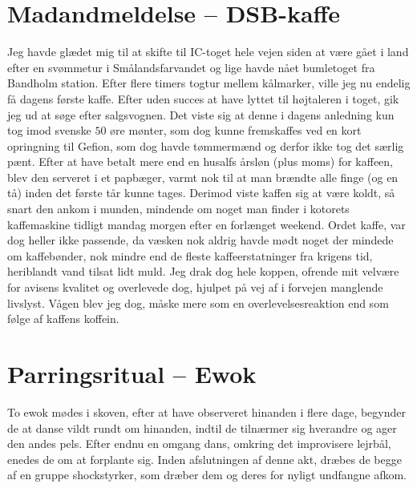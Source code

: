 \begin{minipage}[t]{100mm}
\vspace{3mm}
\section*{Madandmeldelse -- DSB-kaffe}
\vspace{2mm}

Jeg havde glædet mig til at skifte til IC-toget hele vejen siden at være gået i land efter en svømmetur i Smålandsfarvandet og lige havde nået bumletoget fra Bandholm station. Efter flere timers togtur mellem kålmarker, ville jeg nu endelig få dagens første kaffe. Efter uden succes at have lyttet til højtaleren i toget, gik jeg ud at søge efter salgsvognen. Det viste sig at denne i dagens anledning kun tog imod svenske $50$ øre mønter, som dog kunne fremskaffes ved en kort opringning til Gefion, som dog havde tømmermænd og derfor ikke tog det særlig pænt. Efter at have betalt mere end en husalfs årsløn (plus moms) for kaffeen, blev den serveret i et papbæger, varmt nok til at man brændte alle finge (og en tå) inden det første tår kunne tages. Derimod viste kaffen sig at være koldt, så snart den ankom i munden, mindende om noget man finder i kotorets kaffemaskine tidligt mandag morgen efter en forlænget weekend. Ordet kaffe, var dog heller ikke passende, da væsken nok aldrig havde mødt noget der mindede om kaffebønder, nok mindre end de fleste kaffeerstatninger fra krigens tid, heriblandt vand tilsat lidt muld. Jeg drak dog hele koppen, ofrende mit velvære for avisens kvalitet og overlevede dog, hjulpet på vej af i forvejen manglende livslyst. Vågen blev jeg dog, måske mere som en overlevelsesreaktion end som følge af kaffens koffein.

\section*{Parringsritual -- Ewok}
To ewok mødes i skoven, efter at have observeret hinanden i flere dage, begynder de at danse vildt rundt om hinanden, indtil de tilnærmer sig hverandre og ager den andes pels. Efter endnu en omgang dans, omkring det improvisere lejrbål, enedes de om at forplante sig. Inden afslutningen af denne akt, dræbes de begge af en gruppe shockstyrker, som dræber dem og deres for nyligt undfangne afkom.


\end{minipage}
